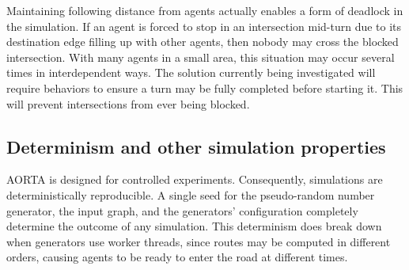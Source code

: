 \documentclass[letterpaper, 10 pt, conference]{ieeeconf}  %
\begin{document}
Maintaining following distance from agents actually enables a form of deadlock
in the simulation. If an agent is forced to stop in an intersection mid-turn due
to its destination edge filling up with other agents, then nobody may cross the
blocked intersection. With many agents in a small area, this situation may
occur several times in interdependent ways. The solution currently being
investigated will require behaviors to ensure a turn may be fully completed
before starting it. This will prevent intersections from ever being blocked.





\subsection{Determinism and other simulation properties}

AORTA is designed for controlled experiments. Consequently, simulations are
deterministically reproducible. A single seed for the pseudo-random number
generator, the input graph, and the generators' configuration completely
determine the outcome of any simulation. This determinism does break down when
generators use worker threads, since routes may be computed in different orders,
causing agents to be ready to enter the road at different times.
\end{document}
